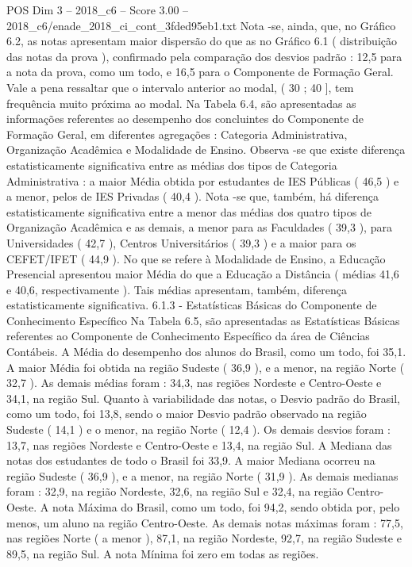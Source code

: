 \begin{textsample}{POS Dim 3 – 2018\_c6 – Score 3.00 – 2018\_c6/enade\_2018\_ci\_cont\_3fded95eb1.txt}
Nota -se, ainda, que, no Gráfico 6.2, as notas apresentam maior dispersão do que as no Gráfico 6.1 ( distribuição das notas da prova ), confirmado pela comparação dos desvios padrão : 12,5 para a nota da prova, como um todo, e 16,5 para o Componente de Formação Geral.
Vale a pena ressaltar que o intervalo anterior ao modal, ( 30 ; 40 ], tem frequência muito próxima ao modal.
Na Tabela 6.4, são apresentadas as informações referentes ao desempenho dos concluintes do Componente de Formação Geral, em diferentes agregações : Categoria Administrativa, Organização Acadêmica e Modalidade de Ensino.
Observa -se que existe diferença estatisticamente significativa entre as médias dos tipos de Categoria Administrativa : a maior Média obtida por estudantes de IES Públicas ( 46,5 ) e a menor, pelos de IES Privadas ( 40,4 ).
Nota -se que, também, há diferença estatisticamente significativa entre a menor das médias dos quatro tipos de Organização Acadêmica e as demais, a menor para as Faculdades ( 39,3 ), para Universidades ( 42,7 ), Centros Universitários ( 39,3 ) e a maior para os CEFET/IFET ( 44,9 ).
No que se refere à Modalidade de Ensino, a Educação Presencial apresentou maior Média do que a Educação a Distância ( médias 41,6 e 40,6, respectivamente ).
Tais médias apresentam, também, diferença estatisticamente significativa. 6.1.3 - Estatísticas Básicas do Componente de Conhecimento Específico Na Tabela 6.5, são apresentadas as Estatísticas Básicas referentes ao Componente de Conhecimento Específico da área de Ciências Contábeis.
A Média do desempenho dos alunos do Brasil, como um todo, foi 35,1.
A maior Média foi obtida na região Sudeste ( 36,9 ), e a menor, na região Norte ( 32,7 ).
As demais médias foram : 34,3, nas regiões Nordeste e Centro-Oeste e 34,1, na região Sul.
Quanto à variabilidade das notas, o Desvio padrão do Brasil, como um todo, foi 13,8, sendo o maior Desvio padrão observado na região Sudeste ( 14,1 ) e o menor, na região Norte ( 12,4 ).
Os demais desvios foram : 13,7, nas regiões Nordeste e Centro-Oeste e 13,4, na região Sul.
A Mediana das notas dos estudantes de todo o Brasil foi 33,9.
A maior Mediana ocorreu na região Sudeste ( 36,9 ), e a menor, na região Norte ( 31,9 ).
As demais medianas foram : 32,9, na região Nordeste, 32,6, na região Sul e 32,4, na região Centro-Oeste.
A nota Máxima do Brasil, como um todo, foi 94,2, sendo obtida por, pelo menos, um aluno na região Centro-Oeste.
As demais notas máximas foram : 77,5, nas regiões Norte ( a menor ), 87,1, na região Nordeste, 92,7, na região Sudeste e 89,5, na região Sul.
A nota Mínima foi zero em todas as regiões.

\end{textsample}
